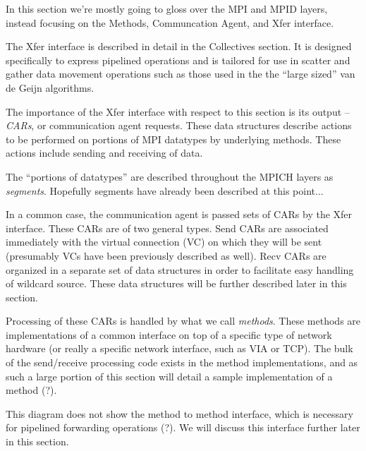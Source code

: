 \documentclass[11pt,letterpaper]{article}
\begin{document}
In this section we're mostly going to gloss over the MPI and MPID layers,
instead focusing on the Methods, Communcation Agent, and Xfer interface.

The Xfer interface is described in detail in the Collectives section.  It is
designed specifically to express pipelined operations and is tailored for use
in scatter and gather data movement operations such as those used in the the
``large sized'' van de Geijn algorithms.

The importance of the Xfer interface with respect to this section is its output
-- \emph{CARs}, or communication agent requests.  These data structures
describe actions to be performed on portions of MPI datatypes by underlying
methods.  These actions include sending and receiving of data.

The ``portions of datatypes'' are described throughout the MPICH layers as
\emph{segments}.  Hopefully segments have already been described at this
point...


In a common case, the communication agent is passed sets of CARs by the Xfer
interface.  These CARs are of two general types.  Send CARs are associated
immediately with the virtual connection (VC) on which they will be sent
(presumably VCs have been previously described as well).  Recv CARs are
organized in a separate set of data structures in order to facilitate easy
handling of wildcard source.  These data structures will be further described
later in this section.

Processing of these CARs is handled by what we call \emph{methods}.  These
methods are implementations of a common interface on top of a specific type of
network hardware (or really a specific network interface, such as VIA or TCP).
The bulk of the send/receive processing code exists in the method
implementations, and as such a large portion of this section will detail a
sample implementation of a method (?).

This diagram does not show the method to method interface, which is necessary
for pipelined forwarding operations (?).  We will discuss this interface
further later in this section.
\end{document}
